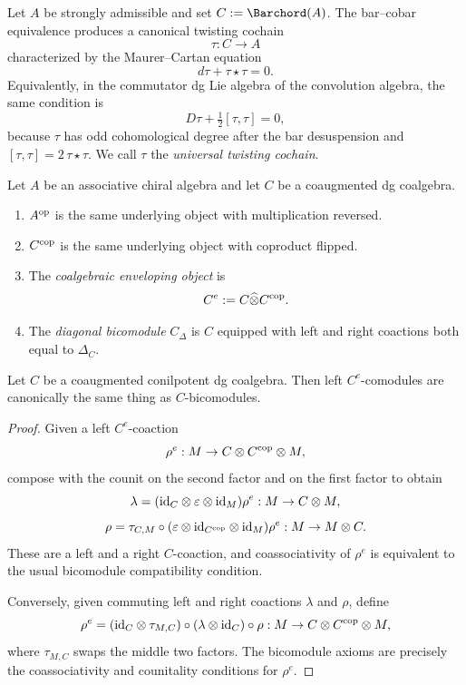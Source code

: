 \begin{definition}
Let $A$ be strongly admissible and set $C:=\Barchord(A)$. The bar--cobar equivalence produces a
canonical twisting cochain
\[
\tau:C\to A
\]
characterized by the Maurer--Cartan equation
\[
d\tau+\tau\star\tau=0.
\]
Equivalently, in the commutator dg Lie algebra of the convolution
algebra, the same condition is
\[
D\tau+\tfrac{1}{2}[\tau,\tau]=0,
\]
because $\tau$ has odd cohomological degree after the bar
desuspension and $[\tau,\tau]=2\,\tau\star\tau$.
We call $\tau$ the \emph{universal twisting cochain}.
\end{definition}

\begin{definition}
Let $A$ be an associative chiral algebra and let $C$ be a coaugmented dg coalgebra.
\begin{enumerate}[label=(\alph*)]
\item $A^{\mathrm{op}}$ is the same underlying object with multiplication reversed.
\item $C^{\mathrm{cop}}$ is the same underlying object with coproduct flipped.
\item The \emph{coalgebraic enveloping object} is
\[
C^e:=C\widehat\otimes C^{\mathrm{cop}}.
\]
\item The \emph{diagonal bicomodule} $C_\Delta$ is $C$ equipped with left and right coactions both
equal to $\Delta_C$.
\end{enumerate}
\end{definition}

\begin{lemma}
\ClaimStatusProvedHere
\label{lem:bicom-e}
Let $C$ be a coaugmented conilpotent dg coalgebra. Then left $C^e$-comodules are canonically the
same thing as $C$-bicomodules.
\end{lemma}

\begin{proof}
Given a left $C^e$-coaction
\[
\rho^e:M\to C\otimes C^{\mathrm{cop}}\otimes M,
\]
compose with the counit on the second factor and on the first factor to obtain
\[
\lambda=(\mathrm{id}_C\otimes \varepsilon\otimes \mathrm{id}_M)\rho^e:M\to C\otimes M,
\]
\[
\rho=
\tau_{C,M}\circ
(\varepsilon\otimes \mathrm{id}_{C^{\mathrm{cop}}}\otimes \mathrm{id}_M)\rho^e
:
M\to M\otimes C.
\]
These are a left and a right $C$-coaction, and coassociativity of $\rho^e$ is equivalent to the
usual bicomodule compatibility condition.

Conversely, given commuting left and right coactions $\lambda$ and $\rho$, define
\[
\rho^e
=
(\mathrm{id}_C\otimes \tau_{M,C})
\circ
(\lambda\otimes \mathrm{id}_C)
\circ \rho
:
M\to C\otimes C^{\mathrm{cop}}\otimes M,
\]
where $\tau_{M,C}$ swaps the middle two factors. The bicomodule axioms are precisely the
coassociativity and counitality conditions for $\rho^e$.
\end{proof}

